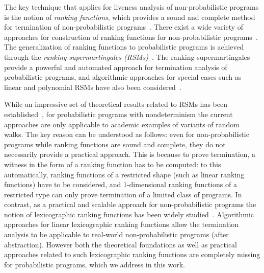 \smallskip{}
The key technique that applies for liveness analysis of non-probabilistic programs is 
the notion of {\em ranking functions}, which provides a sound and complete 
method for termination of non-probabilistic programs~\cite{rwfloyd1967programs}.
There exist a wide variety of approaches for construction 
of ranking functions for non-probabilistic programs~\cite{DBLP:conf/cav/BradleyMS05,DBLP:conf/tacas/ColonS01,DBLP:conf/vmcai/PodelskiR04,DBLP:conf/pods/SohnG91}.
The generalization of ranking functions to probabilistic programs is achieved through the
{\em ranking supermartingales (RSMs)}~\cite{SriramCAV,HolgerPOPL,CF17}.
The ranking supermartingales provide a powerful and automated approach for termination 
analysis of probabilistic programs, and algorithmic approaches for special cases such as 
linear and polynomial RSMs have also been considered~\cite{SriramCAV,CFNH16,CFG16,CNZ17}.



\smallskip{} 
While an impressive set of theoretical results related to RSMs has been
established~\cite{SriramCAV,HolgerPOPL,CF17,CFNH16,CFG16,CNZ17}, 
for probabilistic programs with nondeterminism the current approaches  
are only applicable to academic examples of variants of random walks. 
The key reason can be understood as follows: even for non-probabilistic programs while 
ranking functions are sound and complete, they do not necessarily provide a practical 
approach. This is because to prove termination, a witness in the form of a 
ranking function has to be computed: to this automatically, ranking functions 
of a restricted shape (such as linear ranking functions) have to be considered, 
and 1-dimensional ranking functions of a restricted type can only prove 
termination of a limited class of programs. 
In contrast, as a practical and scalable approach for non-probabilistic programs the 
notion of lexicographic ranking functions has been widely 
studied~\cite{CSZ13,ADFG10:lexicographic,GMR15:rank-extremal,BCIKP16:T2}. 
Algorithmic approaches for linear lexicographic ranking functions allow the 
termination analysis 
to be applicable to real-world non-probabilistic programs (after abstraction).
However both the theoretical foundations as well as practical approaches related to 
such lexicographic ranking functions are completely missing for probabilistic programs,
which we address in this work.







